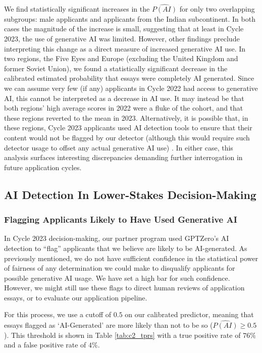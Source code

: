 We find statistically significant increases in the $\widehat{P(AI)}$ for only two overlapping subgroups: male applicants and applicants from the Indian subcontinent. In both cases the magnitude of the increase is small, suggesting that at least in Cycle 2023, the use of generative AI was limited. However, other findings preclude interpreting this change as a direct measure of increased generative AI use. In two regions, the Five Eyes and Europe (excluding the United Kingdom and former Soviet Union), we found a statistically significant decrease in the calibrated estimated probability that essays were completely AI generated. Since we can assume very few (if any) applicants in Cycle 2022 had access to generative AI, this cannot be interpreted as a decrease in AI use. It may instead be that both regions' high average scores in 2022 were a fluke of the cohort, and that these regions reverted to the mean in 2023. Alternatively, it is possible that, in these regions, Cycle 2023 applicants used AI detection tools to ensure that their content would not be flagged by our detector (although this would require such detector usage to offset any actual generative AI use) \cite{gptzero_gptzero_2023}. In either case, this analysis surfaces interesting discrepancies demanding further interrogation in future application cycles. 

\subsection{AI Detection In Lower-Stakes Decision-Making}
\subsubsection{Flagging Applicants Likely to Have Used Generative AI}\label{ssec:flags}
In Cycle 2023 decision-making, our partner program used GPTZero's AI detection to ``flag'' applicants that we believe are likely to be AI-generated. As previously mentioned, we do not have sufficient confidence in the statistical power of fairness of any determination we could make to disqualify applicants for possible generative AI usage. We have set a high bar for such confidence. However, we might still use these flags to direct human reviews of application essays, or to evaluate our application pipeline.

For this process, we use a cutoff of $0.5$ on our calibrated predictor, meaning that essays flagged as `AI-Generated' are more likely than not to be so ($\widehat{P(AI)} \geq 0.5$). This threshold is shown in Table \ref{tab:c2_tprs} with a true positive rate of $76\%$ and a false positive rate of $4\%$.

